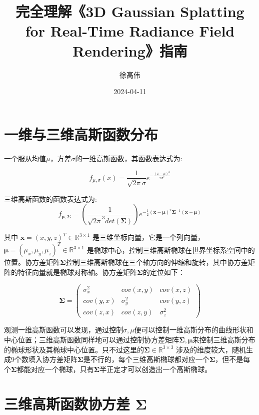 \documentclass[UTF8,a4paper,12pt]{article}
\title{完全理解《3D Gaussian Splatting for Real-Time Radiance Field Rendering》指南}
\author{徐高伟}
\date{2024-04-11} %
\begin{document}
\maketitle


\section{一维与三维高斯函数分布}
一个服从均值$\mu$，方差$\sigma$的一维高斯函数，其函数表达式为:

\begin{equation}
f_{\mu, \sigma}(x) = \frac{1}{\sqrt{2\pi} \sigma} e ^ {- \frac{(x- \mu)^2}{2 \sigma ^2}}
\end{equation}



三维高斯函数的函数表达式为:
\begin{equation}
f_{\bm{\mu}, \bm{\Sigma}} = \left(  \frac{1}{ \sqrt{2\pi}^3 det(\bm{\Sigma})} \right) e ^ {-\frac{1}{2}(\bm{x} - \bm{\mu})^T \bm{\Sigma} ^ {-1} (\bm{x} - \bm{\mu})}  
\end{equation}


其中 $\bm{x} = (x, y, z)^T \in \mathbb{R}^{3 \times 1}$ 是三维坐标向量，它是一个列向量，$\bm{ \mu } = (\mu_x, \mu_y, \mu_z) ^T \in \mathbb{R}^{3 \times 1}$ 是椭球中心，控制三维高斯椭球在世界坐标系空间中的位置。协方差矩阵$\bm{\Sigma}$控制三维高斯椭球在三个轴方向的伸缩和旋转，其中协方差矩阵的特征向量就是椭球对称轴。协方差矩阵$\bm{\Sigma}$的定位如下：

\begin{equation}
\bm{\Sigma} = \begin{pmatrix}
\sigma_x ^2 					& cov(x, y) 					& 	cov(x, z)				\\
cov(y, x) 						& \sigma_y ^2 					&	 cov(y, z)			 	\\
cov(z, x) 						& cov(z, y) 					& 	\sigma_z ^2 			
\end{pmatrix}
\end{equation}

观测一维高斯函数可以发现，通过控制$\sigma, \mu$便可以控制一维高斯分布的曲线形状和中心位置；三维高斯函数同样地可以通过控制协方差矩阵$\bm{\Sigma}, \bm{\mu}$来控制三维高斯分布的椭球形状及其椭球中心位置。只不过这里的$\bm{\Sigma} \in \mathbb{R}^{3\times 3}$ 涉及的维度较大，随机生成9个数填入协方差矩阵$\bm{\Sigma}$是不行的，每个三维高斯椭球都对应一个$\bm{\Sigma}$，但不是每个$\bm{\Sigma}$都能对应一个椭球，只有$\bm{\Sigma}$半正定才可以创造出一个高斯椭球。



\section{三维高斯函数协方差 $\bm{\Sigma}$}
\end{document}
